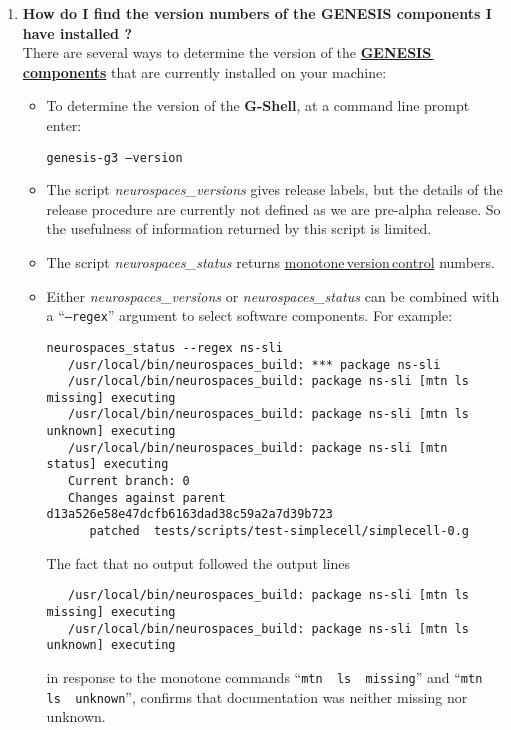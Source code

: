 \documentclass[12pt]{article}
\begin{document}
\begin{enumerate}

\item {\bf How do I find the version numbers of the GENESIS components I have installed ?} \\
There are several ways to determine the version of the \href{../reserved-words/reserved-words.tex}{\bf GENESIS\,components} that are currently installed on your machine:
\begin{itemize}
\item To determine the version of the {\bf G-Shell}, at a command line prompt enter:

{\tt genesis-g3 --version}

\item The script {\it neurospaces\_versions} gives release labels, but the details
of the release procedure are currently not defined as we are pre-alpha release.  So the usefulness of information returned by this script is limited.

\item The script {\it neurospaces\_status} returns \href{../version-control/version-control.tex}{monotone\,version\,control} numbers.

\item Either {\it neurospaces\_versions} or {\it neurospaces\_status} can be combined with a ``{\tt --regex}'' argument to select
software components.  For example:

\begin{verbatim}
neurospaces_status --regex ns-sli
   /usr/local/bin/neurospaces_build: *** package ns-sli
   /usr/local/bin/neurospaces_build: package ns-sli [mtn ls missing] executing
   /usr/local/bin/neurospaces_build: package ns-sli [mtn ls unknown] executing
   /usr/local/bin/neurospaces_build: package ns-sli [mtn status] executing
   Current branch: 0
   Changes against parent d13a526e58e47dcfb6163dad38c59a2a7d39b723
      patched  tests/scripts/test-simplecell/simplecell-0.g
\end{verbatim}

The fact that no output followed the output lines
\begin{verbatim}
   /usr/local/bin/neurospaces_build: package ns-sli [mtn ls missing] executing
   /usr/local/bin/neurospaces_build: package ns-sli [mtn ls unknown] executing
\end{verbatim}
in response to the monotone commands ``{\tt mtn\,\,ls\,\,missing}'' and ``{\tt mtn\,\,ls\,\,unknown}'', confirms that documentation was neither missing nor unknown.


\end{itemize}
\end{enumerate}
\end{document}
